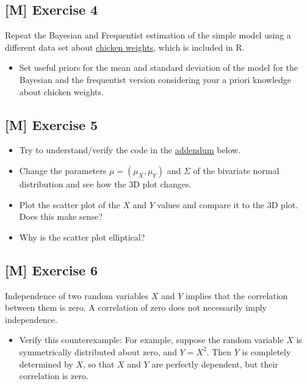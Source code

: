 \documentclass[
]{book}
\providecommand{\tightlist}{%
  \setlength{\itemsep}{0pt}\setlength{\parskip}{0pt}}
\begin{document}
\subsection{{[}M{]} Exercise 4}\label{exercise4_Intro}

Repeat the Bayesian and Frequentist estimation of the simple model using a different data set about
\href{https://stat.ethz.ch/R-manual/R-devel/library/datasets/html/ChickWeight.html}{chicken weights},
which is included in R.

\begin{itemize}
\tightlist
\item
  Set useful priors for the mean and standard deviation of the model
  for the Bayesian and the frequentist version considering
  your a priori knowledge about chicken weights.
\end{itemize}

\subsection{{[}M{]} Exercise 5}\label{exercise5_Intro}

\begin{itemize}
\tightlist
\item
  Try to understand/verify the code in the \hyperref[addendum]{addendum} below.
\item
  Change the parameters \(\mu = (\mu_X, \mu_Y)\) and \(\Sigma\) of the bivariate normal distribution
  and see how the 3D plot changes.
\item
  Plot the scatter plot of the \(X\) and \(Y\) values and compare it to the 3D plot.
  Does this make sense?
\item
  Why is the scatter plot elliptical?
\end{itemize}

\subsection{{[}M{]} Exercise 6}\label{exercise6_Intro}

Independence of two random variables \(X\) and \(Y\) implies that the
correlation between them is zero.
A correlation of zero does not necessarily imply independence.

\begin{itemize}
\tightlist
\item
  Verify this counterexample:
  For example, suppose the random variable \(X\) is symmetrically distributed about zero,
  and \(Y = X^2\). Then \(\mathit{Y}\) is completely determined by \(X\), so that
  \(\mathit{X}\) and \(\mathit{Y}\) are perfectly dependent, but their correlation is zero.
\end{itemize}
\end{document}
